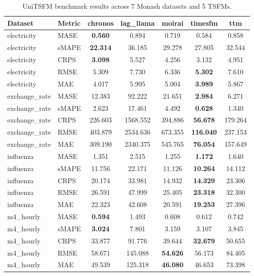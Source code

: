 \begin{table}[t]
\centering
\caption{UniTSFM benchmark results across 7 Monash datasets and 5 TSFMs.}
\label{tab:benchmark}
\begin{tabular}{llccccc}
\toprule
Dataset & Metric & chronos & lag_llama & moirai & timesfm & ttm \\
\midrule
electricity & MASE & \textbf{0.560} & 0.894 & 0.719 & 0.584 & 0.858 \\
electricity & sMAPE & \textbf{22.314} & 36.185 & 29.278 & 27.805 & 32.544 \\
electricity & CRPS & \textbf{3.098} & 5.527 & 4.256 & 3.132 & 4.951 \\
electricity & RMSE & 5.309 & 7.730 & 6.336 & \textbf{5.302} & 7.610 \\
electricity & MAE & 4.017 & 5.995 & 5.004 & \textbf{3.989} & 5.867 \\
exchange_rate & MASE & 12.383 & 92.222 & 21.651 & \textbf{2.984} & 6.271 \\
exchange_rate & sMAPE & 2.623 & 17.461 & 4.492 & \textbf{0.628} & 1.340 \\
exchange_rate & CRPS & 226.603 & 1568.552 & 394.886 & \textbf{56.678} & 179.264 \\
exchange_rate & RMSE & 403.879 & 2534.636 & 673.355 & \textbf{116.040} & 237.153 \\
exchange_rate & MAE & 309.190 & 2340.375 & 545.765 & \textbf{76.054} & 157.649 \\
influenza & MASE & 1.351 & 2.515 & 1.255 & \textbf{1.172} & 1.640 \\
influenza & sMAPE & 11.756 & 22.171 & 11.126 & \textbf{10.264} & 14.112 \\
influenza & CRPS & 20.174 & 33.981 & 14.932 & \textbf{14.329} & 23.306 \\
influenza & RMSE & 26.591 & 47.999 & 25.405 & \textbf{23.318} & 32.300 \\
influenza & MAE & 22.323 & 42.608 & 20.591 & \textbf{19.253} & 27.396 \\
m4_hourly & MASE & \textbf{0.594} & 1.493 & 0.608 & 0.612 & 0.742 \\
m4_hourly & sMAPE & \textbf{3.024} & 7.801 & 3.159 & 3.107 & 3.845 \\
m4_hourly & CRPS & 33.877 & 91.776 & 39.644 & \textbf{32.679} & 50.655 \\
m4_hourly & RMSE & 58.671 & 145.088 & \textbf{54.626} & 56.173 & 84.405 \\
m4_hourly & MAE & 49.539 & 125.318 & \textbf{46.080} & 46.653 & 73.398 \\

\end{tabular}
\end{table}
